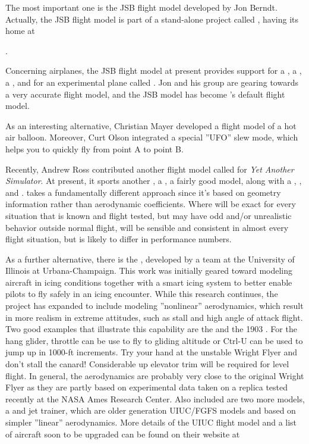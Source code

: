 The most important one is the JSB flight model developed by Jon Berndt. Actually, the JSB
flight model is part of a stand-alone project called \JSBSim, having its home at
 \medskip

.
 \medskip

 \noindent
Concerning airplanes, the JSB flight model at present provides support for a
, a , a , and for an experimental plane
called . Jon and his group are gearing towards a very accurate flight model, and the
JSB model has become \FlightGear{}'s default flight model.

As an interesting alternative, Christian Mayer developed a flight model of a hot air
balloon. Moreover, Curt Olson integrated a special ''UFO'' slew mode, which
helps you to quickly fly from point A to point B.

Recently, Andrew Ross contributed another flight model called \YASim{} for
\textit{Yet Another Simulator}. At present, it sports another , a
, a fairly good  model, along with a ,
, and . \YASim{} takes a fundamentally different approach since it's
based on geometry information rather than aerodynamic coefficients. Where \JSBSim{} will be exact for every situation that is known and flight tested, but may have odd and/or unrealistic behavior outside normal flight, \YASim{} will be sensible and consistent in almost every flight situation, but is likely to differ in performance numbers.

As a further alternative, there is the , developed by a 
team at the University of Illinois at Urbana-Champaign.  This work was 
initially geared toward modeling aircraft in icing conditions together with a smart icing system to better enable pilots to fly safely in an icing 
encounter.  While this research continues, the project has expanded to 
include modeling ''nonlinear'' aerodynamics, which result in more realism 
in extreme attitudes, such as stall and high angle of attack flight.  Two 
good examples that illustrate this capability are the  
 and the 1903 .  For the hang glider, throttle can 
be use to fly to gliding altitude or Ctrl-U can be used to jump up in 
1000-ft increments.  Try your hand at the unstable Wright Flyer and don't 
stall the canard!  Considerable up elevator trim will be required for level 
flight.  In general, the aerodynamics are probably very close to the 
original Wright Flyer as they are partly based on experimental data taken 
on a replica tested recently at the NASA Ames Research Center.  Also 
included are two more models, a  and  jet trainer, 
which are older generation UIUC/FGFS models and based on simpler ''linear'' 
aerodynamics.  More details of the UIUC flight model and a list of aircraft 
soon to be upgraded can be found on their website at
\medskip

